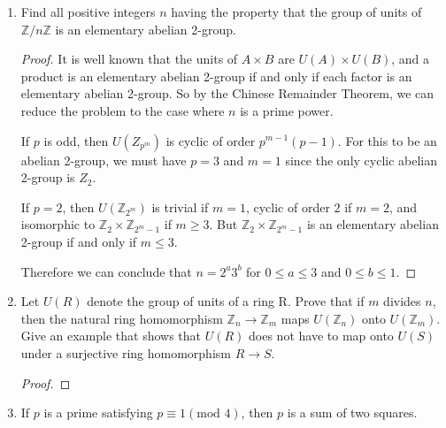 \documentclass{article}
\theoremstyle{definition}
\newcommand{\Z}{\mathbb{Z}}
\newcommand{\x}{\times}
\begin{document}
\begin{enumerate}
            \begin{proof}
                Use the fact that $a$ is a unit if $\gcd(a,24)=1$. So the invertible elements of $\mathbb{Z}_{18}$ are $U_{24}=\{1,5,7,11,13,17,19,23\}$. Note that $x^2=1$ for all $x\in U_{24}$. Therefore $U_{24}$ is not cyclic.
            \end{proof}

            \item Find all positive integers $n$ having the property that the group of units of $\mathbb{Z}/n\mathbb{Z}$ is an elementary abelian 2-group.
            
            \begin{proof}
                It is well known that the units of $A\x B$ are $U(A)\x U(B)$, and a product is an elementary abelian 2-group if and only if each factor is an elementary abelian 2-group. So by the Chinese Remainder Theorem, we can reduce the problem to the case where $n$ is a prime power.

                If $p$ is odd, then $U(Z_{p^m})$ is cyclic of order $p^{m-1}(p-1)$. For this to be an abelian 2-group, we must have $p=3$ and $m=1$ since the only cyclic abelian 2-group is $Z_2$. 

                If $p=2$, then $U(\Z_{2^m})$ is trivial if $m=1$, cyclic of order $2$ if $m=2$, and isomorphic to $\Z_2\x \Z_{2^m-1}$ if $m\geq 3$. But $\Z_2\x \Z_{2^m-1}$ is an elementary abelian 2-group if and only if $m\leq3$.
                
                Therefore we can conclude that $n=2^a3^b$ for $0\leq a \leq 3$ and $0\leq b \leq 1$.
            \end{proof}

            \item Let $U(R)$ denote the group of units of a ring R. Prove that if $m$ divides $n$, then the natural ring homomorphism $\mathbb{Z}_n\to\mathbb{Z}_m$ maps $U(\mathbb{Z}_n)$ onto $U(\mathbb{Z}_m)$. Give an example that shows that $U(R)$ does not have to map onto $U(S)$ under a surjective ring homomorphism $R\to S$.
            
            \begin{proof}
                
            \end{proof}

            \item If $p$ is a prime satisfying $p\equiv 1(\text{mod } 4)$, then $p$ is a sum of two squares.
            

\end{enumerate}
\end{document}
